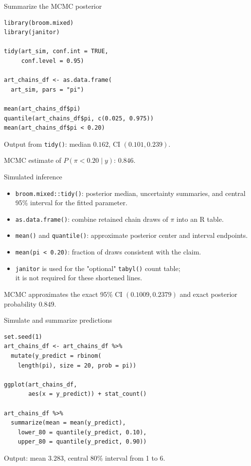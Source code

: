 \documentclass[aspectratio=43]{beamer}
\begin{document}
\begin{frame}[fragile]{Summarize the MCMC posterior}
\begin{lstlisting}
library(broom.mixed)
library(janitor)

tidy(art_sim, conf.int = TRUE,
     conf.level = 0.95)

art_chains_df <- as.data.frame(
  art_sim, pars = "pi")

mean(art_chains_df$pi)
quantile(art_chains_df$pi, c(0.025, 0.975))
mean(art_chains_df$pi < 0.20)
\end{lstlisting}
\small Output from \texttt{tidy()}: median $0.162$, CI $(0.101,0.239)$.\par
\small MCMC estimate of $P(\pi<0.20\mid y)$: $0.846$.
\end{frame}

\begin{frame}{Simulated inference}
\begin{itemize}
\item \texttt{broom.mixed::tidy()}: posterior median, uncertainty summaries, and central 95\% interval for the fitted parameter.
\item \texttt{as.data.frame()}: combine retained chain draws of $\pi$ into an R table.
\item \texttt{mean()} and \texttt{quantile()}: approximate posterior center and interval endpoints.
\item \texttt{mean(pi < 0.20)}: fraction of draws consistent with the claim.
\item \texttt{janitor} is used for the "optional" \texttt{tabyl()} count table;\\it is not required for these shortened lines.
\end{itemize}
\begin{block}{}
MCMC approximates the exact 95\% CI $(0.1009,0.2379)$ and exact posterior probability $0.849$.
\end{block}
\end{frame}

\begin{frame}[fragile]{Simulate and summarize predictions}
\begin{lstlisting}
set.seed(1)
art_chains_df <- art_chains_df %>%
  mutate(y_predict = rbinom(
    length(pi), size = 20, prob = pi))

ggplot(art_chains_df,
       aes(x = y_predict)) + stat_count()

art_chains_df %>%
  summarize(mean = mean(y_predict),
    lower_80 = quantile(y_predict, 0.10),
    upper_80 = quantile(y_predict, 0.90))
\end{lstlisting}
\small Output: mean $3.283$, central 80\% interval from 1 to 6.
\end{frame}
\end{document}
